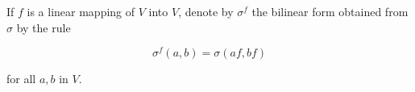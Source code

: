 If $f$ is a linear mapping of $V$ into $V$, denote by $\sigma^f$ the bilinear form obtained from $\sigma$ by the rule

$$\sigma^f(a, b) = \sigma(af, bf)$$

for all $a, b$ in $V$.
